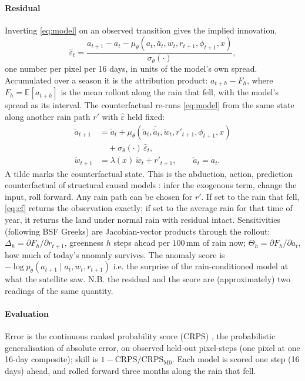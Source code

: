 \documentclass[letterpaper]{article} %
\begin{document}
\paragraph{Residual} Inverting \eqref{eq:model} on an observed transition gives the implied innovation,
\begin{equation}
\hat\varepsilon_t = \frac{a_{t+1} - a_t - \mu_\theta(a_t,\bar a_t,w_t,r_{t+1},\phi_{t+1},x)}{\sigma_\theta(\cdot)},
\label{eq:implied}
\end{equation}
one number per pixel per 16 days, in units of the model's own spread. Accumulated over a season it is the attribution product: $a_{t+h}-F_h$, where $F_h=\mathbb E[a_{t+h}]$ is the mean rollout along the rain that fell, with the model's spread as its interval. The counterfactual re-runs \eqref{eq:model} from the same state along another rain path $r'$ with $\hat\varepsilon$ held fixed:
\begin{align}
\tilde a_{t+1} &= \tilde a_t + \mu_\theta(\tilde a_t,\bar{\tilde a}_t,\tilde w_t,r'_{t+1},\phi_{t+1},x) \nonumber\\
&\quad + \sigma_\theta(\cdot)\,\hat\varepsilon_t, \nonumber\\
\tilde w_{t+1} &= \lambda(x)\,\tilde w_t + r'_{t+1},\qquad \tilde a_t = a_t.
\label{eq:cf}
\end{align}
A tilde marks the counterfactual state. This is the abduction, action, prediction counterfactual of structural causal models \citep{pearl2009}: infer the exogenous term, change the input, roll forward. Any rain path can be chosen for $r'$. If set to the rain that fell, \eqref{eq:cf} returns the observation exactly; if set to the average rain for that time of year, it returns the land under normal rain with residual intact. Sensitivities (following BSF Greeks) are Jacobian-vector products through the rollout: $\Delta_h=\partial F_h/\partial r_{t+1}$, greenness $h$ steps ahead per $100$\,mm of rain now; $\Theta_h=\partial F_h/\partial a_t$, how much of today's anomaly survives. The anomaly score is $-\log p_\theta(a_{t+1}\mid a_t,w_t,r_{t+1})$ i.e. the surprise of the rain-conditioned model at what the satellite saw. N.B. the residual and the score are (approximately) two readings of the same quantity.

\paragraph{Evaluation} Error is the continuous ranked probability score (CRPS) \citep{gneiting2007}, the probabilistic generalisation of absolute error, on observed held-out pixel-steps (one pixel at one 16-day composite); skill is $1-\mathrm{CRPS}/\mathrm{CRPS}_{\mathrm{M0}}$. Each model is scored one step (16 days) ahead, and rolled forward three months along the rain that fell.
\end{document}
